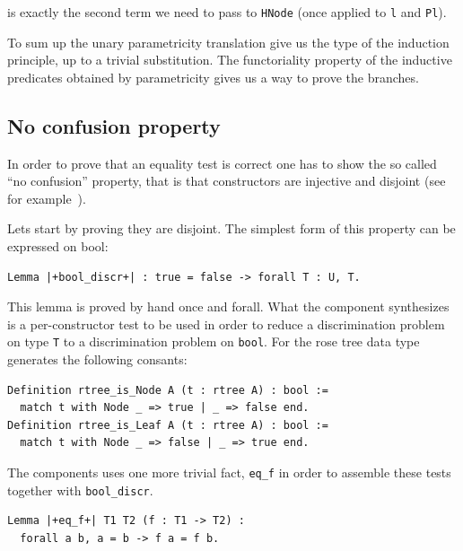 \documentclass[sigplan,10pt,review]{acmart}\settopmatter{printfolios=true,printccs=false,printacmref=false}
\newcommand{\derive}[1]{\keys{#1}}
\begin{document}
\noindent
is exactly the second term we need to pass to \lstinline+HNode+
(once applied to \lstinline+l+ and \lstinline+Pl+).

To sum up the unary parametricity translation give us the type
of the induction principle, up to a trivial substitution.
The functoriality property of the inductive predicates obtained by
parametricity gives us a way to prove the branches.

\subsection{No confusion property} %

In order to prove that an equality test is correct
one has to show the so called ``no confusion'' property, that is that
constructors are injective and disjoint (see for
example~\cite{10.1007/11617990_12}).

Lets start by proving they are disjoint.
The simplest form of this property can be expressed on bool:

\begin{minipage}{\textwidth}\begin{lstlisting}
Lemma |+bool_discr+| : true = false -> forall T : U, T.
\end{lstlisting}\end{minipage}

\noindent
This lemma is proved by hand once and forall. What the \derive{isK}
component synthesizes is a per-constructor test to be used in order
to reduce a discrimination problem on type \lstinline+T+ to a
discrimination problem on \lstinline+bool+. For the rose tree data
type \derive{isK} generates the following consants:

\begin{minipage}{\textwidth}\begin{lstlisting}
Definition rtree_is_Node A (t : rtree A) : bool :=
  match t with Node _ => true | _ => false end.
Definition rtree_is_Leaf A (t : rtree A) : bool :=
  match t with Node _ => false | _ => true end.
\end{lstlisting}\end{minipage}

\noindent
The \derive{discriminate} components uses one more trivial fact,
\lstinline+eq_f+ in order to assemble these tests together
with \lstinline+bool_discr+.

\begin{minipage}{\textwidth}\begin{lstlisting}
Lemma |+eq_f+| T1 T2 (f : T1 -> T2) :
  forall a b, a = b -> f a = f b.
\end{lstlisting}\end{minipage}
\end{document}
